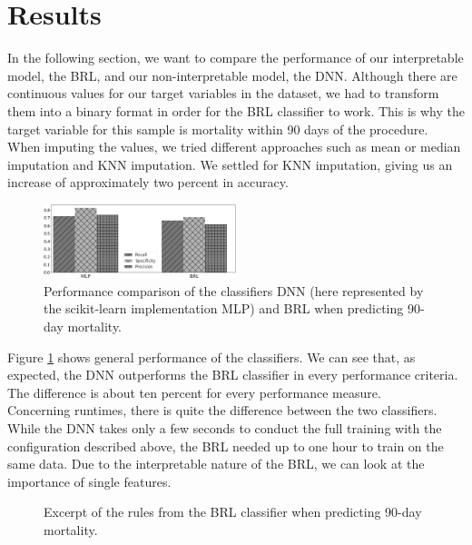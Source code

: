 \documentclass[conference,comsoc]{IEEEtran}
\begin{document}
\section{Results}
\label{sec:results}
In the following section, we want to compare the performance of our interpretable model, the BRL, and our non-interpretable model, the DNN.
Although there are continuous values for our target variables in the dataset, we had to transform them into a binary format in order for the BRL classifier to work.
This is why the target variable for this sample is mortality within 90 days of the procedure. \\
When imputing the values, we tried different approaches such as mean or median imputation and KNN imputation.
We settled for KNN imputation, giving us an increase of approximately two percent in accuracy.
\begin{figure}[h]
	\centering
	\includegraphics[width=0.5\textwidth]{class_DIED_90DAYS_adjusted_scale.png}
	\vspace*{-6mm}
	\caption{Performance comparison of the classifiers DNN (here represented by the scikit-learn implementation MLP) and BRL when predicting 90-day mortality.}
	\label{fig:mortalityCLASS}
\end{figure}
\clearpage
Figure \ref{fig:mortalityCLASS} shows general performance of the classifiers.
We can see that, as expected, the DNN outperforms the BRL classifier in every performance criteria.
The difference is about ten percent for every performance measure. \\
Concerning runtimes, there is quite the difference between the two classifiers.
While the DNN takes only a few seconds to conduct the full training with the configuration described above, the BRL needed up to one hour to train on the same data.
Due to the interpretable nature of the BRL, we can look at the importance of single features.
\begin{figure}[h]
	\centering
	{
	\setlength{\fboxsep}{0pt}
	\setlength{\fboxrule}{1pt}
	}
	\caption{Excerpt of the rules from the BRL classifier when predicting 90-day mortality.}
	\label{fig:mortalityBRL}
\end{figure} \\
\end{document}
